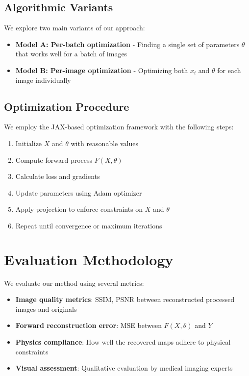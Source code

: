 \documentclass[nomenclature, english, bibtex]{kththesis}
\numberwithin{listing}{chapter}
\begin{document}
\subsection{Algorithmic Variants}
We explore two main variants of our approach:
\begin{itemize}
    \item \textbf{Model A: Per-batch optimization} - Finding a single set of parameters $\theta$ that works well for a batch of images
    \item \textbf{Model B: Per-image optimization} - Optimizing both $x_i$ and $\theta$ for each image individually
\end{itemize}

\subsection{Optimization Procedure}
We employ the JAX-based optimization framework with the following steps:
\begin{enumerate}
    \item Initialize $X$ and $\theta$ with reasonable values
    \item Compute forward process $F(X, \theta)$
    \item Calculate loss and gradients
    \item Update parameters using Adam optimizer
    \item Apply projection to enforce constraints on $X$ and $\theta$
    \item Repeat until convergence or maximum iterations
\end{enumerate}

\section{Evaluation Methodology}
We evaluate our method using several metrics:
\begin{itemize}
    \item \textbf{Image quality metrics}: SSIM, PSNR between reconstructed processed images and originals
    \item \textbf{Forward reconstruction error}: MSE between $F(X, \theta)$ and $Y$
    \item \textbf{Physics compliance}: How well the recovered maps adhere to physical constraints
    \item \textbf{Visual assessment}: Qualitative evaluation by medical imaging experts
\end{itemize}
\end{document}
